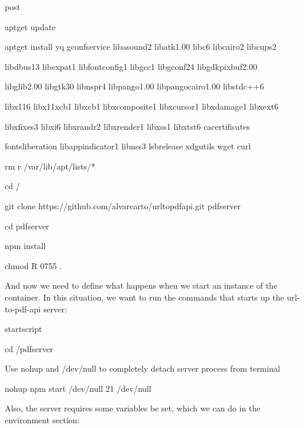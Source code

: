 \documentclass[letterpaper,10pt,english]{sphinxmanual}
\begin{document}
%
\begin{sphinxVerbatim}[commandchars=\\\{\}]
\PYGZpc{}post

     apt\PYGZhy{}get update

     apt\PYGZhy{}get install \PYGZhy{}yq gconf\PYGZhy{}service libasound2 libatk1.0\PYGZhy{}0 libc6 libcairo2 libcups2 \PYGZbs{}

     libdbus\PYGZhy{}1\PYGZhy{}3 libexpat1 libfontconfig1 libgcc1 libgconf\PYGZhy{}2\PYGZhy{}4 libgdk\PYGZhy{}pixbuf2.0\PYGZhy{}0 \PYGZbs{}

     libglib2.0\PYGZhy{}0 libgtk\PYGZhy{}3\PYGZhy{}0 libnspr4 libpango\PYGZhy{}1.0\PYGZhy{}0 libpangocairo\PYGZhy{}1.0\PYGZhy{}0 libstdc++6 \PYGZbs{}

     libx11\PYGZhy{}6 libx11\PYGZhy{}xcb1 libxcb1 libxcomposite1 libxcursor1 libxdamage1 libxext6 \PYGZbs{}

     libxfixes3 libxi6 libxrandr2 libxrender1 libxss1 libxtst6 ca\PYGZhy{}certificates \PYGZbs{}

     fonts\PYGZhy{}liberation libappindicator1 libnss3 lsb\PYGZhy{}release xdg\PYGZhy{}utils wget curl

     rm \PYGZhy{}r /var/lib/apt/lists/*

     cd /

     git clone https://github.com/alvarcarto/url\PYGZhy{}to\PYGZhy{}pdf\PYGZhy{}api.git pdf\PYGZus{}server

     cd pdf\PYGZus{}server

     npm install

     chmod \PYGZhy{}R 0755 .
\end{sphinxVerbatim}

And now we need to define what happens when we start an instance of the
container. In this situation, we want to run the commands that starts up
the url-to-pdf-api server:

%
\begin{sphinxVerbatim}[commandchars=\\\{\}]
\PYGZpc{}startscript

    cd /pdf\PYGZus{}server

    \PYGZsh{} Use nohup and /dev/null to completely detach server process from terminal

    nohup npm start \PYGZgt{} /dev/null 2\PYGZgt{}\PYGZam{}1 \PYGZlt{} /dev/null \PYGZam{}
\end{sphinxVerbatim}

Also, the  server requires  some variables be set, which we can do in the
environment section:
\end{document}
